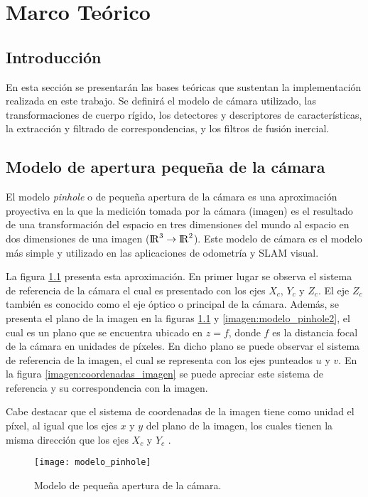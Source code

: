 \chapter{Marco Teórico}
\label{capitulo3}


\section{Introducción}

En esta sección se presentarán las bases teóricas que sustentan la implementación realizada en este trabajo. Se definirá el modelo de cámara utilizado, las transformaciones de cuerpo rígido, los detectores y descriptores de características, la extracción y filtrado de correspondencias, y los filtros de fusión inercial.


\section{Modelo de apertura pequeña de la cámara}
El modelo \textit{pinhole} o de pequeña apertura de la cámara es una aproximación proyectiva en la que la medición tomada por la cámara (imagen) es el resultado de una transformación del espacio en tres dimensiones del mundo  al espacio en dos dimensiones de una imagen (${\rm I\!R}^3 \to {\rm I\!R}^2$). Este modelo de cámara es el modelo más simple y utilizado en las aplicaciones de odometría y SLAM visual.

La figura  \ref{imagen:modelo_pinhole}  presenta esta aproximación. En primer lugar se observa el sistema de referencia de la cámara el cual es presentado con los ejes $X_{c}$, $Y_{c}$ y $Z_{c}$. El eje $Z_{c}$ también es conocido como el eje óptico o principal de la cámara. Además, se presenta el plano de la imagen en la figuras \ref{imagen:modelo_pinhole} y \ref{imagen:modelo_pinhole2}, el cual es un plano que se encuentra ubicado en $z= f$, donde $f$ es la distancia focal de la cámara en unidades de píxeles. En dicho plano se puede observar el sistema de referencia de la imagen, el cual se representa con los ejes punteados $u$ y $v$. En la figura \ref{imagen:coordenadas_imagen} se puede apreciar este sistema de referencia y su correspondencia con la imagen.

Cabe destacar que el sistema de coordenadas de la imagen tiene como unidad el píxel, al igual que los ejes $x$ y $y$ del plano de la imagen, los cuales tienen la misma dirección que los ejes $X_{c}$ y $Y_{c}$ .


\begin{figure}[H]
	\centering
	\texttt{[image: modelo\_pinhole]}
	\caption[Modelo de apertura pequeña de la cámara]{Modelo de  pequeña apertura de la cámara\protect\footnotemark.}
	\label{imagen:modelo_pinhole}
\end{figure}

